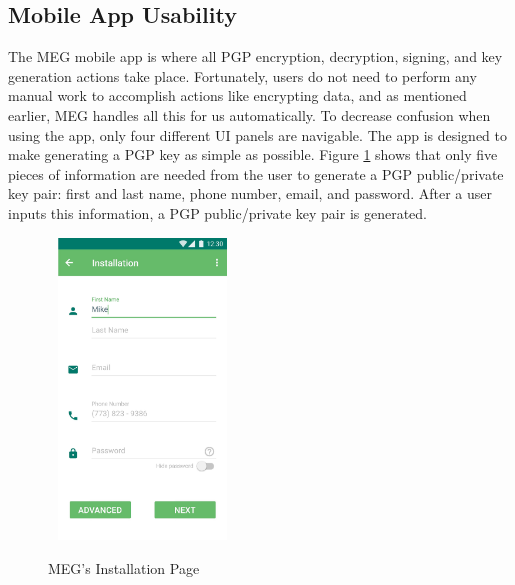 \documentclass[10pt]{article}
\begin{document}
\begin{multicols}{2}
\subsection{Mobile App Usability}
\par The MEG mobile app is where all PGP encryption, decryption, signing, and key generation actions take place. Fortunately, users do not need to perform any manual work to accomplish actions like encrypting data, and as mentioned earlier, MEG handles all this for us automatically. To decrease confusion when using the app, only four different UI panels are navigable. The app is designed to make generating a PGP key as simple as possible. Figure \ref{fig:installation} shows that only five pieces of information are needed from the user to generate a PGP public/private key pair: first and last name, phone number, email, and password. After a user inputs this information, a PGP public/private key pair is generated.
\begin{figure}[H]
    \centering
    \includegraphics[height=8cm,width=5cm]{installation-page.jpg}
    \label{fig:installation}
    \caption{MEG's Installation Page}
\end{figure}

\end{multicols}
\end{document}
